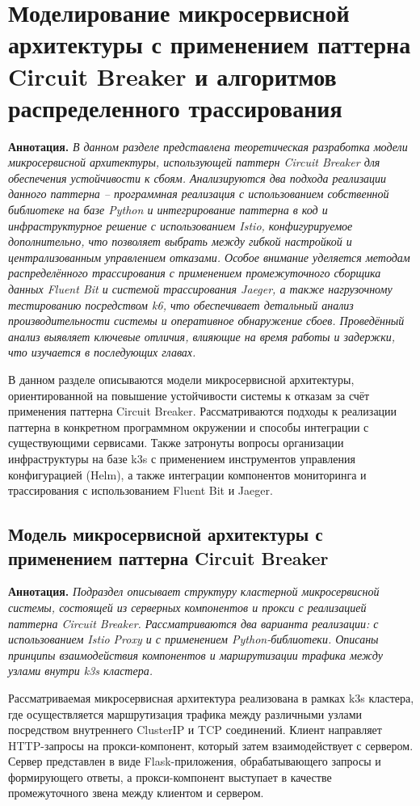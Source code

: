 \chapter{Моделирование микросервисной архитектуры с применением паттерна Circuit Breaker и алгоритмов распределенного трассирования}

\textbf{Аннотация.} \textit{ В данном разделе представлена теоретическая разработка модели микросервисной архитектуры, использующей паттерн Circuit Breaker для обеспечения устойчивости к сбоям.  Анализируются два подхода реализации данного паттерна – программная реализация с использованием собственной библиотеке на базе Python и интегрирование паттерна в код и инфраструктурное решение с использованием Istio, конфигурируемое дополнительно, что позволяет выбрать между гибкой настройкой и централизованным управлением отказами. Особое внимание уделяется методам распределённого трассирования с применением промежуточного сборщика данных Fluent Bit и системой трассирования Jaeger, а также нагрузочному тестированию посредством k6, что обеспечивает детальный анализ производительности системы и оперативное обнаружение сбоев. Проведённый анализ выявляет ключевые отличия, влияющие на время работы и задержки, что изучается в последующих главах.}

В данном разделе описываются модели микросервисной архитектуры, ориентированной на повышение устойчивости системы к отказам за счёт применения паттерна Circuit Breaker. Рассматриваются подходы к реализации паттерна в конкретном программном окружении и способы интеграции с существующими сервисами. Также затронуты вопросы организации инфраструктуры на базе k3s с применением инструментов управления конфигурацией (Helm), а также интеграции компонентов мониторинга и трассирования с использованием Fluent Bit и Jaeger. 

  
\section{Модель микросервисной архитектуры с применением паттерна Circuit Breaker}
  
\textbf{Аннотация.} \textit{Подраздел описывает структуру кластерной микросервисной системы, состоящей из серверных компонентов и прокси с реализацией паттерна Circuit Breaker. Рассматриваются два варианта реализации: с использованием Istio Proxy и с применением Python-библиотеки. Описаны принципы взаимодействия компонентов и маршрутизации трафика между узлами внутри k3s кластера.}

Рассматриваемая микросервисная архитектура реализована в рамках k3s кластера, где осуществляется маршрутизация трафика между различными узлами посредством внутреннего ClusterIP и TCP соединений. Клиент направляет HTTP-запросы на прокси-компонент, который затем взаимодействует с сервером. Сервер представлен в виде Flask-приложения, обрабатывающего запросы и формирующего ответы, а прокси-компонент выступает в качестве промежуточного звена между клиентом и сервером.

